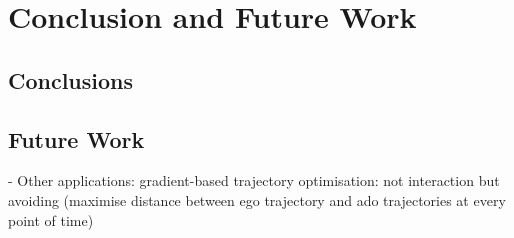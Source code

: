 \chapter{Conclusion and Future Work}
\label{text:conclusion}

\section{Conclusions}
\label{text:conclusions/conclusions}

\section{Future Work}
\label{text:conclusions/future_work}

- Other applications: gradient-based trajectory optimisation: not interaction but avoiding (maximise distance between ego trajectory and ado trajectories at every point of time)